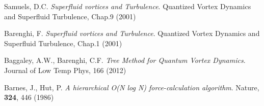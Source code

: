 \begin{thebibliography}{99}
	{\sc Samuels, D.C.}
	\emph{Superfluid vortices and Turbulence}. Quantized Vortex Dynamics and Superfluid Turbulence, Chap.9 (2001)

	{\sc Barenghi, F.}
	\emph{Superfluid vortices and Turbulence}. Quantized Vortex Dynamics and Superfluid Turbulence, Chap.1 (2001)

	{\sc Baggaley, A.W., Barenghi, C.F.}
	\emph{Tree Method for Quantum Vortex Dynamics}. Journal of Low Temp Phys, 166 (2012)

	{\sc Barnes, J., Hut, P.}
	\emph{A hierarchical O(N log N) force-calculation algorithm}. Nature, \textbf{324}, 446 (1986)




\end{thebibliography}
